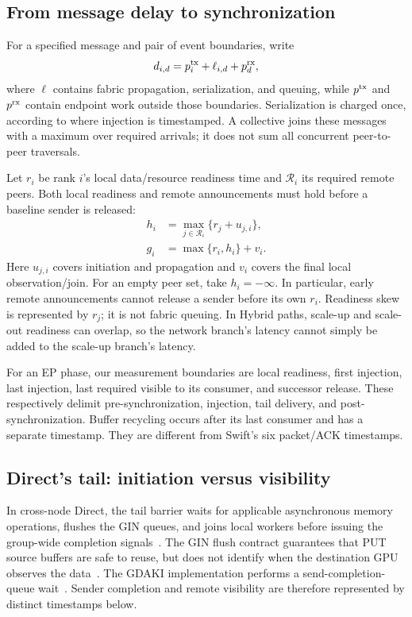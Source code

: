 \subsection{From message delay to synchronization}
For a specified message and pair of event boundaries, write
\begin{equation}
 d_{i,d}=p_i^{\rm tx}+\ell_{i,d}+p_d^{\rm rx},
 \label{eq:message}
\end{equation}
where $\ell$ contains fabric propagation, serialization, and queuing, while $p^{\rm tx}$ and $p^{\rm rx}$ contain endpoint work outside those boundaries. Serialization is charged once, according to where injection is timestamped. A collective joins these messages with a maximum over required arrivals; it does not sum all concurrent peer-to-peer traversals.

Let $r_i$ be rank $i$'s local data/resource readiness time and $\mathcal{R}_i$ its required remote peers. Both local readiness and remote announcements must hold before a baseline sender is released:
\begin{equation}
 \begin{aligned}
 h_i&=\max_{j\in\mathcal{R}_i}\{r_j+u_{j,i}\},\\
 g_i&=\max\{r_i,h_i\}+v_i.
 \end{aligned}
 \label{eq:gate}
\end{equation}
Here $u_{j,i}$ covers \ready{} initiation and propagation and $v_i$ covers the final local observation/join. For an empty peer set, take $h_i=-\infty$. In particular, early remote announcements cannot release a sender before its own $r_i$. Readiness skew is represented by $r_j$; it is not fabric queuing. In Hybrid paths, scale-up and scale-out readiness can overlap, so the network branch's latency cannot simply be added to the scale-up branch's latency.

For an EP phase, our measurement boundaries are local readiness, first \data{} injection, last \data{} injection, last required \data{} visible to its consumer, and successor release. These respectively delimit pre-synchronization, injection, tail delivery, and post-synchronization. Buffer recycling occurs after its last consumer and has a separate timestamp. They are different from Swift's six packet/ACK timestamps.



\subsection{Direct's tail: initiation versus visibility}
\label{sec:directtail}
In cross-node Direct, the tail barrier waits for applicable asynchronous memory operations, flushes the GIN queues, and joins local workers before issuing the group-wide completion signals~\cite{deepepcode}. The GIN flush contract guarantees that PUT source buffers are safe to reuse, but does not identify when the destination GPU observes the data~\cite{ginheader,gindocs}. The GDAKI implementation performs a send-completion-queue wait~\cite{gdakicode}. Sender completion and remote visibility are therefore represented by distinct timestamps below.

